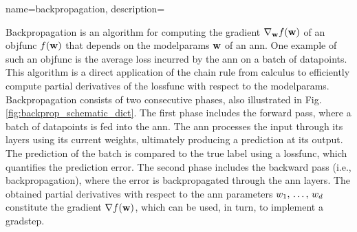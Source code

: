 {name={backpropagation},
 	description={Backpropagation is an \gls{algorithm} for computing the \gls{gradient} 
	 	$\nabla_{{\bf w}} f({\bf w})$ of an \gls{objfunc} $f({\bf w})$ that depends on the 
	  	\glspl{modelparam} ${\bf w}$ of an \gls{ann}. One example of such an \gls{objfunc} 
	  	is the average \gls{loss} incurred by the \gls{ann} on a \gls{batch} of \glspl{datapoint}. 
	  	This \gls{algorithm} is a direct application of the chain rule from calculus to 
	  	efficiently compute partial derivatives of the \gls{lossfunc} with respect to the \glspl{modelparam}.
		Backpropagation consists of two consecutive phases, also illustrated in Fig. \ref{fig:backprop_schematic_dict}. 
		The first phase includes the forward pass, where a \gls{batch} of 
		\glspl{datapoint} is fed into the \gls{ann}. The \gls{ann} processes the input through its \glspl{layer} using its current 
		\gls{weights}, ultimately producing a \gls{prediction} at its output. The \gls{prediction} of the \gls{batch} is compared to 
	   	the true \gls{label} using a \gls{lossfunc}, which quantifies the \gls{prediction} error. The second phase includes the 
		backward pass (i.e., backpropagation), where the error is backpropagated through the \gls{ann} \glspl{layer}. 
	   	The obtained partial derivatives with respect to the \gls{ann} \glspl{parameter} $w_{1},\,\ldots,\,w_{d}$ 
	   	constitute the \gls{gradient} $\nabla f({\bf w})$, which can be used, in turn, to implement a \gls{gradstep}.
	   	\begin{figure}[H]
		\centering
\end{figure}}}

